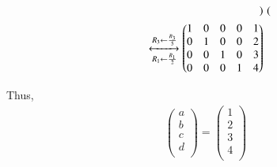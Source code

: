 \begin{equation}
\begin{aligned}
\begin{pmatrix}
    \end{pmatrix}\\
    \xleftrightarrow
    [R_1\leftarrow \frac{R_1}{2}]{R_3\leftarrow \frac{R_3}{5}}
    \begin{pmatrix}
      1       & 0    & 0   & 0  & 1\\ 
      0       & 1   & 0   & 0  & 2\\
      0       & 0    & 1   & 0  & 3\\ 
      0       & 0   & 0   & 1   & 4\\
            
    \end{pmatrix}
\end{aligned}
\end{equation}

Thus, 
\begin{equation}
\begin{aligned}
\begin{pmatrix}
      a\\ 
      b\\
      c\\
      d\\
            
    \end{pmatrix} = \begin{pmatrix}
      1\\ 
      2\\
      3\\
      4\\
            
    \end{pmatrix} 
\end{aligned}
\end{equation}



